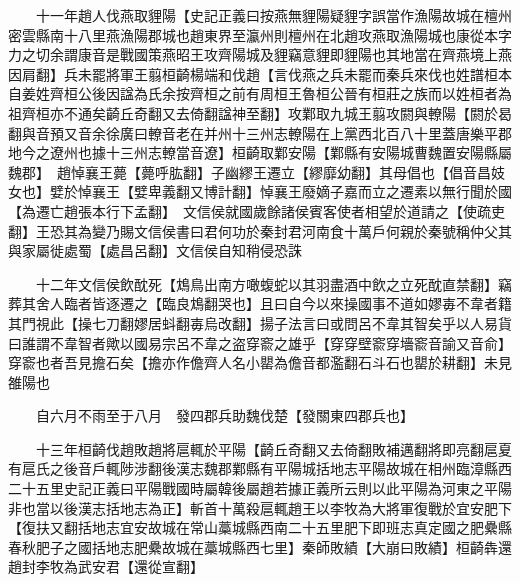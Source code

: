 　　十一年趙人伐燕取貍陽【史記正義曰按燕無貍陽疑貍字誤當作漁陽故城在檀州密雲縣南十八里燕漁陽郡城也趙東界至瀛州則檀州在北趙攻燕取漁陽城也康從本字力之切余謂康音是戰國策燕昭王攻齊陽城及貍竊意貍即貍陽也其地當在齊燕境上燕因肩翻】兵未罷將軍王翦桓齮楊端和伐趙【言伐燕之兵未罷而秦兵來伐也姓譜桓本自姜姓齊桓公後因諡為氏余按齊桓之前有周桓王魯桓公晉有桓莊之族而以姓桓者為祖齊桓亦不通矣齮丘奇翻又去倚翻諡神至翻】攻鄴取九城王翦攻閼與轑陽【閼於曷翻與音預又音余徐廣曰轑音老在并州十三州志轑陽在上黨西北百八十里蓋唐樂平郡地今之遼州也據十三州志轑當音遼】桓齮取鄴安陽【鄴縣有安陽城曹魏置安陽縣屬魏郡】　趙悼襄王薨【薨呼肱翻】子幽繆王遷立【繆靡幼翻】其母倡也【倡音昌妓女也】嬖於悼襄王【嬖卑義翻又博計翻】悼襄王廢嫡子嘉而立之遷素以無行聞於國【為遷亡趙張本行下孟翻】　文信侯就國歲餘諸侯賓客使者相望於道請之【使疏吏翻】王恐其為變乃賜文信侯書曰君何功於秦封君河南食十萬戶何親於秦號稱仲父其與家屬徙處蜀【處昌呂翻】文信侯自知稍侵恐誅

　　十二年文信侯飲酖死【鴆鳥出南方噉蝮蛇以其羽盡酒中飲之立死酖直禁翻】竊葬其舍人臨者皆逐遷之【臨良鴆翻哭也】且曰自今以來操國事不道如嫪毐不韋者籍其門視此【操七刀翻嫪居蚪翻毐烏改翻】揚子法言曰或問呂不韋其智矣乎以人易貨曰誰謂不韋智者歟以國易宗呂不韋之盗穿窬之雄乎【穿穿壁窬穿墻窬音諭又音俞】穿窬也者吾見擔石矣【擔亦作儋齊人名小罌為儋音都濫翻石斗石也罌於耕翻】未見雒陽也

　　自六月不雨至于八月　發四郡兵助魏伐楚【發關東四郡兵也】

　　十三年桓齮伐趙敗趙將扈輒於平陽【齮丘奇翻又去倚翻敗補邁翻將即亮翻扈夏有扈氏之後音戶輒陟涉翻後漢志魏郡鄴縣有平陽城括地志平陽故城在相州臨漳縣西二十五里史記正義曰平陽戰國時屬韓後屬趙若據正義所云則以此平陽為河東之平陽非也當以後漢志括地志為正】斬首十萬殺扈輒趙王以李牧為大將軍復戰於宜安肥下【復扶又翻括地志宜安故城在常山藁城縣西南二十五里肥下即班志真定國之肥纍縣春秋肥子之國括地志肥纍故城在藁城縣西七里】秦師敗績【大崩曰敗績】桓齮犇還趙封李牧為武安君【還從宣翻】


